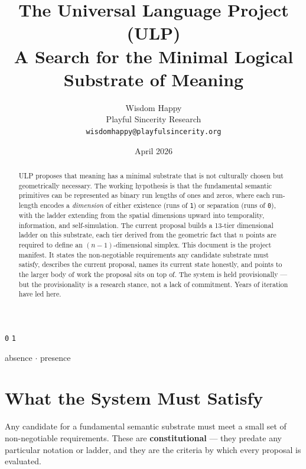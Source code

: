 \documentclass[11pt, letterpaper]{article}
\title{\textbf{The Universal Language Project (ULP)}\\[0.5em]
       \large\normalfont A Search for the Minimal Logical Substrate of Meaning}
\author{Wisdom Happy\\\small Playful Sincerity Research\\\small\texttt{wisdomhappy@playfulsincerity.org}}
\date{April 2026}
\begin{document}
\maketitle

\begin{center}
\vspace{-0.5em}
{\Huge \texttt{0} \quad \texttt{1}}

\vspace{0.4em}
{\small absence \quad $\cdot$ \quad presence}
\end{center}

\vspace{1.5em}

\begin{abstract}
\noindent ULP proposes that meaning has a minimal substrate that is not culturally chosen but geometrically necessary. The working hypothesis is that the fundamental semantic primitives can be represented as binary run lengths of ones and zeros, where each run-length encodes a \emph{dimension} of either existence (runs of \texttt{1}) or separation (runs of \texttt{0}), with the ladder extending from the spatial dimensions upward into temporality, information, and self-simulation. The current proposal builds a 13-tier dimensional ladder on this substrate, each tier derived from the geometric fact that $n$ points are required to define an $(n-1)$-dimensional simplex. This document is the project manifest. It states the non-negotiable requirements any candidate substrate must satisfy, describes the current proposal, names its current state honestly, and points to the larger body of work the proposal sits on top of. The system is held provisionally --- but the provisionality is a research stance, not a lack of commitment. Years of iteration have led here.
\end{abstract}

\section{What the System Must Satisfy}

Any candidate for a fundamental semantic substrate must meet a small set of non-negotiable requirements. These are \textbf{constitutional} --- they predate any particular notation or ladder, and they are the criteria by which every proposal is evaluated.
\end{document}

